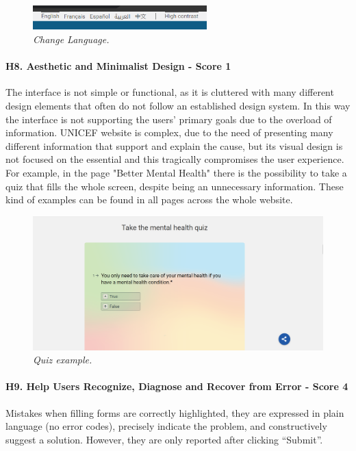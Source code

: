 \begin{figure}[h]
	\centering
	\begin{center}
		\includegraphics[width=0.6\textwidth]{Picture11B.png}
	\end{center}
	\captionsetup{font=small}
	\caption{\textit{Change Language.}}
	\label{fig:label11B}
\end{figure}

\paragraph*{H8. Aesthetic and Minimalist Design - Score 1}
The interface is not simple or functional, as it is cluttered with many different design elements that often do not follow an established design system. In this way the interface is not supporting the users’ primary goals due to the overload of information. UNICEF website is complex, due to the need of presenting many different information that support and explain the cause, but its visual design is not focused on the essential and this tragically compromises the user experience.
For example, in the page "Better Mental Health" there is the possibility to take a quiz that fills the whole screen, despite being an unnecessary information. These kind of examples can be found in all pages across the whole website.

\begin{figure}[h]
	\centering
	\begin{center}
		\includegraphics[width=\textwidth]{Picture12.png}
	\end{center}
	\captionsetup{font=small}
	\caption{\textit{Quiz example.}}
	\label{fig:label12}
\end{figure}

\paragraph*{H9. Help Users Recognize, Diagnose and Recover from Error  - Score 4}
Mistakes when filling forms are correctly highlighted, they are expressed in plain language (no error codes), precisely indicate the problem, and constructively suggest a solution. However, they are only reported after clicking “Submit”.

